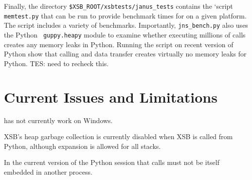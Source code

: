 Finally, the directory {\tt \$XSB\_ROOT/xsbtests/janus\_tests} contains the
`script {\tt memtest.py} that can be run to provide benchmark times
for on a given platform.  The script includes a variety of benchmarks.
Importantly, {\tt jns\_bench.py} also uses the Python {\tt
  guppy.heapy} module to examine whether executing millions of
\januspy{} calls creates any memory leaks in Python.  Running the
script on recent version of Python show that \januspy{} calling and
\janus{} data transfer creates virtually no memory leaks for Python.
      {\sc TES: need to recheck this.}
      
\section{Current Issues and Limitations} \label{sec:jns-py-limits}


\bi
\item \januspy{} has not currently work on Windows.
\item XSB's heap garbage collection is currently disabled when XSB is
  called from Python, although expansion is allowed for all stacks.
\item In the current version of \januspy{} the Python session that
  calls \januspy{} must not be itself embedded in another process.
  \ei
  
 

